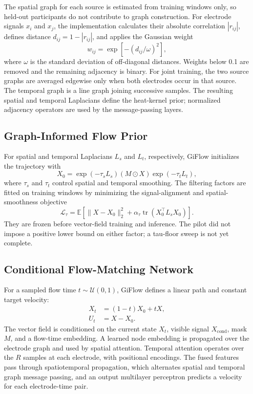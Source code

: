 \documentclass{article}
\begin{document}
The spatial graph for each source is estimated from training windows only,
so held-out participants do not contribute to graph construction. For
electrode signals $x_i$ and $x_j$, the implementation calculates their
absolute correlation $|r_{ij}|$, defines distance
$d_{ij}=1-|r_{ij}|$, and applies the Gaussian weight
\begin{equation}
    w_{ij}=\exp\left[-(d_{ij}/\omega)^2\right],
\end{equation}
where $\omega$ is the standard deviation of off-diagonal distances. Weights
below 0.1 are removed and the remaining adjacency is binary. For joint
training, the two source graphs are averaged edgewise only when both
electrodes occur in that source. The temporal graph is a line graph joining
successive samples. The resulting spatial and temporal Laplacians define
the heat-kernel prior; normalized adjacency operators are used by the
message-passing layers.

\subsection{Graph-Informed Flow Prior}

For spatial and temporal Laplacians $L_s$ and $L_t$, respectively, GiFlow
initializes the trajectory with
\begin{equation}
    X_0 =
    \exp(-\tau_s L_s)(M \odot X)\exp(-\tau_t L_t),
    \label{eq:prior}
\end{equation}
where $\tau_s$ and $\tau_t$ control spatial and temporal smoothing. The
filtering factors are fitted on training windows by minimizing the
signal-alignment and spatial-smoothness objective
\begin{equation}
    \mathcal{L}_{\tau} =
    \mathbb{E}\left[
    \|X-X_0\|_2^2 +
    \alpha_{\tau}\operatorname{tr}(X_0^\top L_s X_0)
    \right].
    \label{eq:tau}
\end{equation}
They are frozen before vector-field training and inference. The pilot did
not impose a positive lower bound on either factor; a tau-floor sweep is
not yet complete.

\subsection{Conditional Flow-Matching Network}

For a sampled flow time $t\sim\mathcal{U}(0,1)$, GiFlow defines a linear
path and constant target velocity:
\begin{align}
    X_t &= (1-t)X_0+tX, \\
    U_t &= X-X_0.
\end{align}
The vector field is conditioned on the current state $X_t$, visible signal
$X_{\mathrm{cond}}$, mask $M$, and a flow-time embedding. A learned node
embedding is propagated over the electrode graph and used by spatial
attention. Temporal attention operates over the $R$ samples at each
electrode, with positional encodings. The fused features pass through
spatiotemporal propagation, which alternates spatial and temporal graph
message passing, and an output multilayer perceptron predicts a velocity
for each electrode-time pair.
\end{document}
